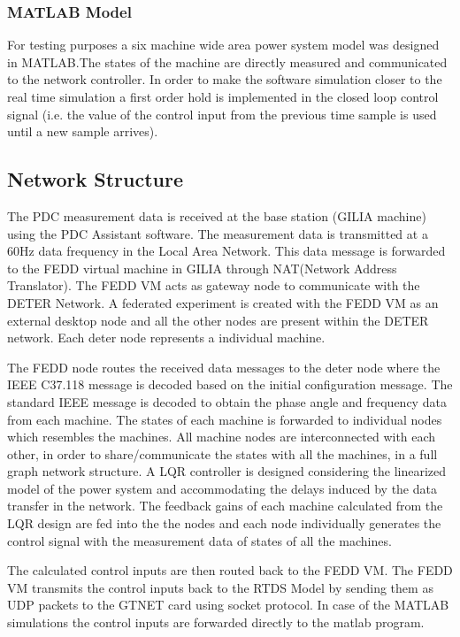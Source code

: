 \documentclass[a4paper]{article}
\begin{document}
\subsubsection{MATLAB Model}

For testing purposes a six machine wide area power system model was designed in MATLAB.The states of the machine are directly measured and communicated to the network controller. In order to make the software simulation closer to the real time simulation a first order hold is implemented in the closed loop control signal (i.e. the value of the control input from the previous time sample is used until a new sample arrives).

\subsection{Network Structure}
 
 The PDC measurement data is received at the base station (GILIA machine) using the PDC Assistant software. The measurement data is transmitted at a 60Hz data frequency in the Local Area Network. This data message is forwarded to the FEDD virtual machine in GILIA through NAT(Network Address Translator). The FEDD VM acts as gateway node to  communicate with the DETER Network. A federated experiment is created with the FEDD VM as an external desktop node and all the other nodes are present within the DETER network. Each deter node represents a individual machine.
 
 The FEDD node routes the received data messages to the deter node where the IEEE C37.118 message is decoded based on the initial configuration message. The standard IEEE message is decoded to obtain the phase angle and frequency data from each machine. The states of each machine is forwarded to individual nodes which resembles the machines. All machine nodes are interconnected with each other, in order to share/communicate the states with all the machines, in a full graph network structure. A LQR controller is designed considering the linearized model of the power system and accommodating the delays induced by the data transfer in the network. The feedback gains of each machine calculated from the LQR design are fed into the the nodes and each node individually generates the control signal with the measurement data of states of all the machines.

 The calculated control inputs are then routed back to the FEDD VM. The FEDD VM transmits the control inputs back to the RTDS Model by sending them as UDP packets to the GTNET card using socket protocol. In case of the MATLAB simulations the control inputs are forwarded directly to the matlab program. 
 
\end{document}
